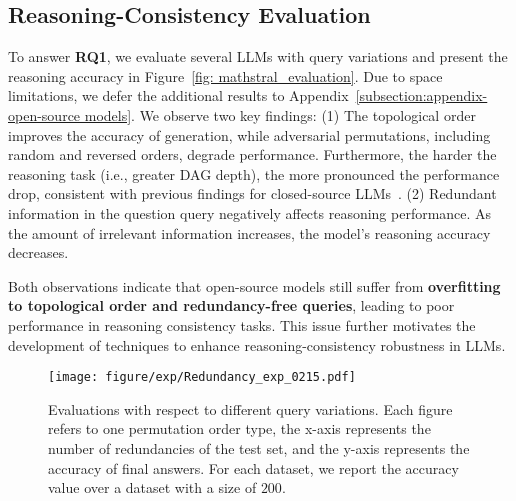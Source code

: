 \subsection{Reasoning-Consistency Evaluation}
\label{subsection: Reasoning-Equivalence Evaluation}
To answer \textbf{RQ1}, we evaluate several LLMs with query variations and present the reasoning accuracy in Figure~\ref{fig: mathstral_evaluation}. Due to space limitations, we defer the additional results to Appendix~\ref{subsection:appendix-open-source models}. We observe two key findings: (1) The topological order improves the accuracy of generation, while adversarial permutations, including random and reversed orders, degrade performance. Furthermore, the harder the reasoning task (i.e., greater DAG depth), the more pronounced the performance drop, consistent with previous findings for closed-source LLMs~\citep{chen2024premise}.
(2) {Redundant information in the question query negatively affects reasoning performance.} As the amount of irrelevant information increases, the model's reasoning accuracy decreases.


Both observations indicate that open-source models still suffer from \textbf{overfitting to topological order and redundancy-free queries}, leading to poor performance in reasoning consistency tasks. This issue further motivates the development of techniques to enhance reasoning-consistency robustness in LLMs.





\begin{figure*}[ht]
    \centering
    \texttt{[image: figure/exp/Redundancy\_exp\_0215.pdf]}
    \caption{Evaluations with respect to different query variations. Each figure refers to one permutation order type, the x-axis represents the number of redundancies of the test set, and the y-axis represents the accuracy of final answers. For each dataset, we report the accuracy value over a dataset with a size of $200$. 
    }
    \label{fig: Math reasoning}
    \vspace{-2mm}
\end{figure*}

